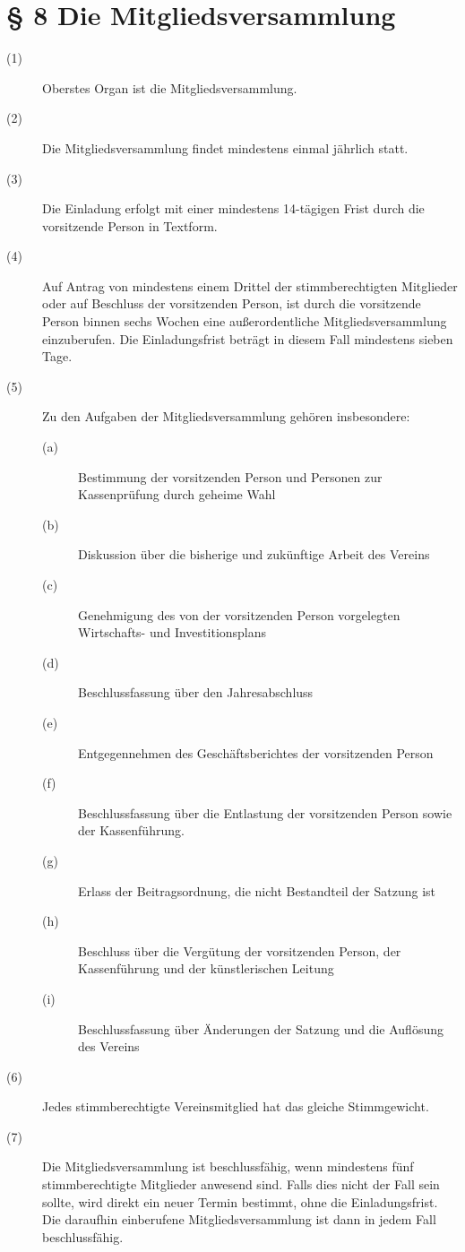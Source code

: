 \documentclass[a4paper,12pt]{scrartcl}
\begin{document}
\section*{\S{} 8 Die Mitgliedsversammlung}
\begin{description} 

\item[(1)] Oberstes Organ ist die Mitgliedsversammlung.
\item[(2)] Die Mitgliedsversammlung findet mindestens einmal jährlich statt.
\item[(3)] Die Einladung erfolgt mit einer mindestens 14-tägigen Frist durch die vorsitzende Person in Textform.
\item[(4)] Auf Antrag von mindestens einem Drittel der stimmberechtigten Mitglieder oder auf Beschluss der vorsitzenden Person, ist durch die vorsitzende Person binnen sechs Wochen eine außerordentliche Mitgliedsversammlung einzuberufen. Die Einladungsfrist beträgt in diesem Fall mindestens sieben Tage.
\item[(5)] Zu den Aufgaben der Mitgliedsversammlung gehören insbesondere:
\begin{description} 
\item[(a)] Bestimmung der vorsitzenden Person und Personen zur Kassenprüfung durch geheime Wahl
\item[(b)] Diskussion über die bisherige und zukünftige Arbeit des Vereins
\item[(c)] Genehmigung des von der vorsitzenden Person vorgelegten Wirtschafts- und Investitionsplans
\item[(d)] Beschlussfassung über den Jahresabschluss
\item[(e)] Entgegennehmen des Geschäftsberichtes der vorsitzenden Person
\item[(f)] Beschlussfassung über die Entlastung der vorsitzenden Person sowie der Kassenführung.
\item[(g)] Erlass der Beitragsordnung, die nicht Bestandteil der Satzung ist
\item[(h)] Beschluss über die Vergütung der vorsitzenden Person, der Kassenführung und der künstlerischen Leitung
\item[(i)] Beschlussfassung über Änderungen der Satzung und die Auflösung des Vereins 
\end{description}
\item[(6)] Jedes stimmberechtigte Vereinsmitglied hat das gleiche Stimmgewicht.
\item[(7)] Die Mitgliedsversammlung ist beschlussfähig, wenn mindestens fünf stimmberechtigte Mitglieder anwesend sind. Falls dies nicht der Fall sein sollte, wird direkt ein neuer Termin bestimmt, ohne die Einladungsfrist. Die daraufhin einberufene Mitgliedsversammlung ist dann in jedem Fall beschlussfähig.

\end{description}
\end{document}
